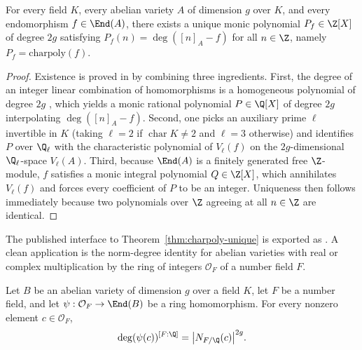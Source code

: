 \begin{theorem}
\label{thm:charpoly-unique}
For every field $K$, every abelian variety $A$ of dimension $g$ over $K$, and
every endomorphism $f \in \End(A)$, there exists a unique monic polynomial
$P_f \in \Z[X]$ of degree $2g$ satisfying $P_f(n) = \deg([n]_A - f)$ for all
$n \in \Z$, namely $P_f = \mathrm{charpoly}(f)$.
\end{theorem}

\begin{proof}
Existence is proved in  by
combining three ingredients. First, the degree of an integer linear combination
of homomorphisms is a homogeneous polynomial of degree $2g$
, which
yields a monic rational polynomial $P \in \Q[X]$ of degree $2g$ interpolating
$\deg([n]_A - f)$. Second, one picks an auxiliary prime $\ell$ invertible in
$K$ (taking $\ell = 2$ if $\operatorname{char} K \neq 2$ and $\ell = 3$
otherwise) and identifies $P$ over $\Q_\ell$ with the characteristic polynomial
of $V_\ell(f)$ on the $2g$-dimensional $\Q_\ell$-space $V_\ell(A)$. Third,
because $\End(A)$ is a finitely generated free $\Z$-module, $f$ satisfies a
monic integral polynomial $Q \in \Z[X]$, which annihilates $V_\ell(f)$ and forces
every coefficient of $P$ to be an integer. Uniqueness then follows immediately
because two polynomials over $\Z$ agreeing at all $n \in \Z$ are identical.
\end{proof}

The published interface to Theorem~\ref{thm:charpoly-unique} is exported as
. A clean application
is the norm-degree identity for abelian varieties with real or complex
multiplication by the ring of integers $\mathcal{O}_F$ of a number field $F$.

\begin{theorem}
\label{thm:norm-degree}
Let $B$ be an abelian variety of dimension $g$ over a field $K$, let $F$ be a
number field, and let $\psi : \mathcal{O}_F \to \End(B)$ be a ring
homomorphism. For every nonzero element $c \in \mathcal{O}_F$,
\[
  \deg(\psi(c))^{[F:\Q]} = \bigl|N_{F/\Q}(c)\bigr|^{2g}.
\]
\end{theorem}

